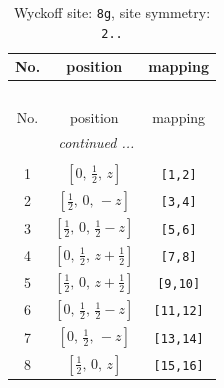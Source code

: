 \documentclass[fleqn,8pt]{jsarticle}
\begin{document}
\begin{longtable}{ccc}
\caption{Wyckoff site: {\tt 8g}, site symmetry: {\tt 2..}}
 \\
 \hline \hline
No. & position & mapping \\ \hline \endfirsthead

\multicolumn{2}{l}{\tablename\ \thetable{}} \\
 \hline \hline
No. & position & mapping \\ \hline \endhead

 \hline \hline
\multicolumn{2}{r}{\footnotesize\it continued ...} \\ \endfoot

 \hline \hline
\multicolumn{2}{r}{} \\ \endlastfoot

1 & $\left[ 0,\, \frac{1}{2},\, z \right]$ & {\tt [1,2]} \\ \hline
2 & $\left[ \frac{1}{2},\, 0,\, - z \right]$ & {\tt [3,4]} \\ \hline
3 & $\left[ \frac{1}{2},\, 0,\, \frac{1}{2} - z \right]$ & {\tt [5,6]} \\ \hline
4 & $\left[ 0,\, \frac{1}{2},\, z + \frac{1}{2} \right]$ & {\tt [7,8]} \\ \hline
5 & $\left[ \frac{1}{2},\, 0,\, z + \frac{1}{2} \right]$ & {\tt [9,10]} \\ \hline
6 & $\left[ 0,\, \frac{1}{2},\, \frac{1}{2} - z \right]$ & {\tt [11,12]} \\ \hline
7 & $\left[ 0,\, \frac{1}{2},\, - z \right]$ & {\tt [13,14]} \\ \hline
8 & $\left[ \frac{1}{2},\, 0,\, z \right]$ & {\tt [15,16]} \\
\end{longtable}
\renewcommand{\arraystretch}{1.2}
\end{document}
